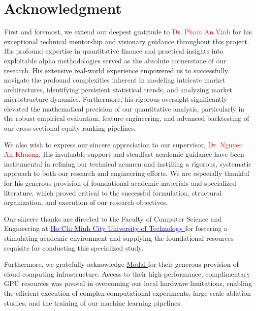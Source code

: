 \part*{Acknowledgment}
First and foremost, we extend our deepest gratitude to \textcolor{red}{Dr. Pham An Vinh} for his exceptional technical mentorship and visionary guidance throughout this project. His profound expertise in quantitative finance and practical insights into exploitable alpha methodologies served as the absolute cornerstone of our research. His extensive real-world experience empowered us to successfully navigate the profound complexities inherent in modeling intricate market architectures, identifying persistent statistical trends, and analyzing market microstructure dynamics. Furthermore, his rigorous oversight significantly elevated the mathematical precision of our quantitative analysis, particularly in the robust empirical evaluation, feature engineering, and advanced backtesting of our cross-sectional equity ranking pipelines.

\medskip

We also wish to express our sincere appreciation to our supervisor, \textcolor{red}{Dr. Nguyen An Khuong}. His invaluable support and steadfast academic guidance have been instrumental in refining our technical acumen and instilling a rigorous, systematic approach to both our research and engineering efforts. We are especially thankful for his generous provision of foundational academic materials and specialized literature, which proved critical to the successful formulation, structural organization, and execution of our research objectives.

\medskip

Our sincere thanks are directed to the Faculty of Computer Science and Engineering at \href{https://hcmut.edu.vn}{\textcolor{blue}{Ho Chi Minh City University of Technology} } for fostering a stimulating academic environment and supplying the foundational resources requisite for conducting this specialized study.

\medskip

Furthermore, we gratefully acknowledge \href{https://modal.com}{\textcolor{modal-color}{Modal} } for their generous provision of cloud computing infrastructure. Access to their high-performance, complimentary \acl{GPU} resources was pivotal in overcoming our local hardware limitations, enabling the efficient execution of complex computational experiments, large-scale ablation studies, and the training of our machine learning pipelines.


